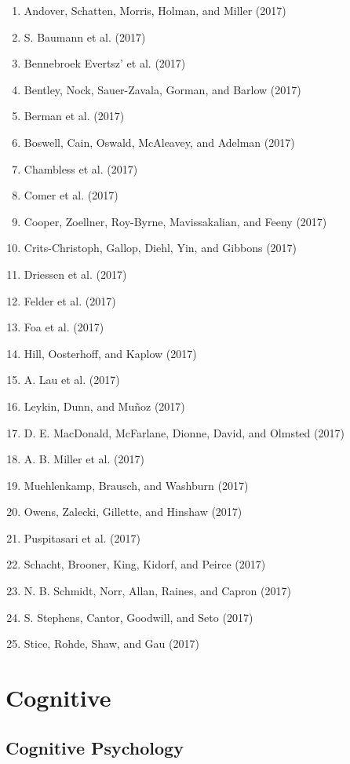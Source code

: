 \documentclass[english,man]{apa6}
\providecommand{\tightlist}{%
  \setlength{\itemsep}{0pt}\setlength{\parskip}{0pt}}
\theoremstyle{definition}
\theoremstyle{definition}
\theoremstyle{definition}
\theoremstyle{remark}
\begin{document}
\begin{enumerate}
\def\labelenumi{\arabic{enumi})}
\tightlist
\item
  Andover, Schatten, Morris, Holman, and Miller (2017)
\item
  S. Baumann et al. (2017)
\item
  Bennebroek Evertsz' et al. (2017)
\item
  Bentley, Nock, Sauer-Zavala, Gorman, and Barlow (2017)
\item
  Berman et al. (2017)
\item
  Boswell, Cain, Oswald, McAleavey, and Adelman (2017)
\item
  Chambless et al. (2017)
\item
  Comer et al. (2017)
\item
  Cooper, Zoellner, Roy-Byrne, Mavissakalian, and Feeny (2017)
\item
  Crits-Christoph, Gallop, Diehl, Yin, and Gibbons (2017)
\item
  Driessen et al. (2017)
\item
  Felder et al. (2017)
\item
  Foa et al. (2017)
\item
  Hill, Oosterhoff, and Kaplow (2017)
\item
  A. Lau et al. (2017)
\item
  Leykin, Dunn, and Muñoz (2017)
\item
  D. E. MacDonald, McFarlane, Dionne, David, and Olmsted (2017)
\item
  A. B. Miller et al. (2017)
\item
  Muehlenkamp, Brausch, and Washburn (2017)
\item
  Owens, Zalecki, Gillette, and Hinshaw (2017)
\item
  Puspitasari et al. (2017)
\item
  Schacht, Brooner, King, Kidorf, and Peirce (2017)
\item
  N. B. Schmidt, Norr, Allan, Raines, and Capron (2017)
\item
  S. Stephens, Cantor, Goodwill, and Seto (2017)
\item
  Stice, Rohde, Shaw, and Gau (2017)
\end{enumerate}

\section{Cognitive}\label{cognitive}

\subsection{Cognitive Psychology}\label{cognitive-psychology}
\end{document}
